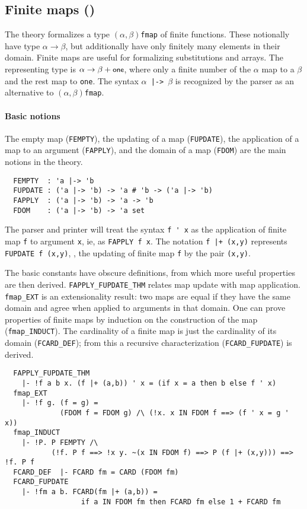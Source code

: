 \subsection{Finite maps ()}\label{finite_map}

The theory  formalizes a type
$(\alpha,\beta)$\verb+fmap+ of finite functions. These notionally have
type $\alpha\to\beta$, but additionally have only finitely many
elements in their domain. Finite maps are useful for formalizing
substitutions and arrays. The representing type is $\alpha\to\beta +
\mbox{\small{\textbf{\sf{one}}}}$, where only a finite number of the $\alpha$ map to a
$\beta$ and the rest map to \verb+one+. The syntax
$\alpha$\verb+ |-> +$\beta$ is recognized by the parser as an
alternative to $(\alpha,\beta)$\verb+fmap+.

\paragraph {Basic notions}

The empty map ({\small\verb+FEMPTY+}), the updating of a map
({\small\verb+FUPDATE+}), the application of a map to an argument
({\small\verb+FAPPLY+}), and the domain of a map
({\small\verb+FDOM+}) are the main notions in the theory.
%
{\small
\begin{verbatim}
  FEMPTY  : 'a |-> 'b
  FUPDATE : ('a |-> 'b) -> 'a # 'b -> ('a |-> 'b)
  FAPPLY  : ('a |-> 'b) -> 'a -> 'b
  FDOM    : ('a |-> 'b) -> 'a set
\end{verbatim}}

The \HOL{} parser and printer will treat the syntax \verb+f ' x+ as
the application of finite map \verb+f+ to argument \verb+x+, ie, as
{\small\verb+FAPPLY f x+}. The notation \verb#f |+ (x,y)# represents
{\small\verb+FUPDATE f (x,y)+}, \ie, the updating of finite map
\verb+f+ by the pair \verb+(x,y)+.

The basic constants have obscure definitions, from which more useful
properties are then derived. {\small\verb+FAPPLY_FUPDATE_THM+} relates
map update with map application.  {\small\verb+fmap_EXT+} is an
extensionality result: two maps are equal if they have the same domain
and agree when applied to arguments in that domain. One can prove
properties of finite maps by induction on the construction of the map
({\small\verb+fmap_INDUCT+}).  The cardinality of a finite map is
just the cardinality of its domain ({\small\verb+FCARD_DEF+}); from
this a recursive characterization ({\small\verb+FCARD_FUPDATE+}) is
derived.
%
{\small
\begin{verbatim}
  FAPPLY_FUPDATE_THM
    |- !f a b x. (f |+ (a,b)) ' x = (if x = a then b else f ' x)
  fmap_EXT
    |- !f g. (f = g) =
             (FDOM f = FDOM g) /\ (!x. x IN FDOM f ==> (f ' x = g ' x))
  fmap_INDUCT
    |- !P. P FEMPTY /\
           (!f. P f ==> !x y. ~(x IN FDOM f) ==> P (f |+ (x,y))) ==> !f. P f
  FCARD_DEF  |- FCARD fm = CARD (FDOM fm)
  FCARD_FUPDATE
    |- !fm a b. FCARD(fm |+ (a,b)) =
                  if a IN FDOM fm then FCARD fm else 1 + FCARD fm
\end{verbatim}}

